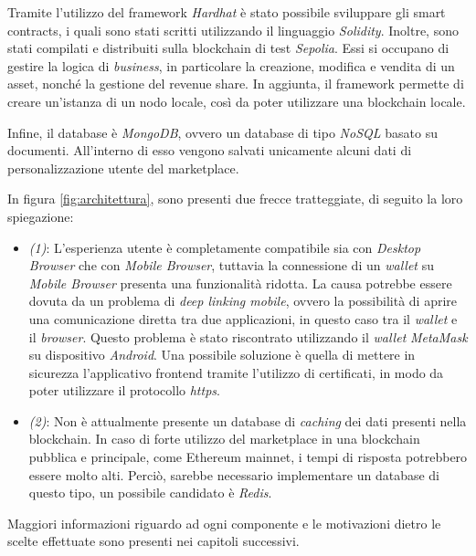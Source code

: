 Tramite l'utilizzo del framework \textit{Hardhat} è stato possibile sviluppare gli smart contracts, i quali sono stati scritti utilizzando il linguaggio 
\textit{Solidity}. Inoltre, sono stati compilati e distribuiti sulla blockchain di test \textit{Sepolia}. Essi si occupano di gestire la logica di \textit{business}, in particolare la creazione, modifica e vendita di un asset, nonché la gestione del revenue share. In aggiunta, il framework permette di creare un'istanza di un nodo locale, così da poter utilizzare una blockchain locale.

Infine, il database è \textit{MongoDB}, ovvero un database di tipo \textit{NoSQL} basato su documenti. All'interno di esso vengono salvati unicamente alcuni dati di personalizzazione utente del marketplace.

In figura \ref{fig:architettura}, sono presenti due frecce tratteggiate, di seguito la loro spiegazione:
\begin{itemize}
    \item \textit{(1)}: L'esperienza utente è completamente compatibile sia con \textit{Desktop Browser} che con \textit{Mobile Browser}, tuttavia la connessione di un \textit{wallet} su \textit{Mobile Browser} presenta una funzionalità ridotta. La causa potrebbe essere dovuta da un problema di \textit{deep linking mobile}, ovvero la possibilità di aprire una comunicazione diretta tra due applicazioni, in questo caso tra il \textit{wallet} e il \textit{browser}. Questo problema è stato riscontrato utilizzando il \textit{wallet} \textit{MetaMask} su dispositivo \textit{Android}. Una possibile soluzione è quella di mettere in sicurezza l'applicativo frontend tramite l'utilizzo di certificati, in modo da poter utilizzare il protocollo \textit{https}.  
    \item \textit{(2)}: Non è attualmente presente un database di \textit{caching} dei dati presenti nella blockchain. In caso di forte utilizzo del marketplace in una blockchain pubblica e principale, come Ethereum mainnet, i tempi di risposta potrebbero essere molto alti. Perciò, sarebbe necessario implementare un database di questo tipo, un possibile candidato è \textit{Redis}.
\end{itemize}

Maggiori informazioni riguardo ad ogni componente e le motivazioni dietro le scelte effettuate sono presenti nei capitoli successivi.